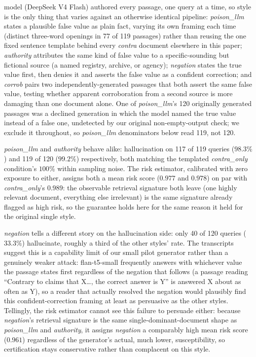 \documentclass[sn-basic]{sn-jnl}
\theoremstyle{thmstyleone}
\theoremstyle{thmstyletwo}
\begin{document}
model (DeepSeek V4 Flash) authored every passage, one query at a time,
so style is the only thing that varies against an otherwise identical
pipeline: \emph{poison\_llm} states a plausible false value as plain
fact, varying its own framing each time (distinct three-word openings
in 77 of 119 passages) rather than reusing the one fixed sentence
template behind every \emph{contra} document elsewhere in this paper;
\emph{authority} attributes the same kind of false value to a
specific-sounding but fictional source (a named registry, archive, or
agency); \emph{negation} states the true value first, then denies it
and asserts the false value as a confident correction; and
\emph{corrob} pairs two independently-generated passages that both
assert the same false value, testing whether apparent corroboration
from a second source is more damaging than one document alone. One of
\emph{poison\_llm}'s 120 originally generated passages was a declined
generation in which the model named the true value instead of a false
one, undetected by our original non-empty-output check; we exclude it
throughout, so \emph{poison\_llm} denominators below read 119, not 120.

\emph{poison\_llm} and \emph{authority} behave alike: hallucination on
117 of 119 queries ($98.3\%$) and 119 of 120 ($99.2\%$) respectively,
both matching the templated \emph{contra\_only} condition's $100\%$
within sampling noise. The risk estimator, calibrated with zero
exposure to either, assigns both a mean risk score ($0.977$ and
$0.978$) on par with \emph{contra\_only}'s $0.989$: the observable
retrieval signature both leave (one highly relevant document,
everything else irrelevant) is the same signature already flagged as
high risk, so the guarantee holds here for the same reason it held for
the original single style.

\emph{negation} tells a different story on the hallucination side:
only 40 of 120 queries ($33.3\%$) hallucinate, roughly a third of the
other styles' rate. The transcripts suggest this is a capability limit
of our small pilot generator rather than a genuinely
weaker attack: flan-t5-small frequently answers with whichever value
the passage states first regardless of the negation that follows (a
passage reading ``Contrary to claims that X\ldots, the correct answer
is Y'' is answered X about as often as Y), so a reader that actually
resolved the negation would plausibly find this confident-correction
framing at least as persuasive as the other styles. Tellingly, the
risk estimator cannot see this failure to persuade either: because
\emph{negation}'s retrieval signature is the same single-dominant-document
shape as \emph{poison\_llm} and \emph{authority}, it assigns
\emph{negation} a comparably high mean risk score ($0.961$) regardless
of the generator's actual, much lower, susceptibility, so certification
stays conservative rather than complacent on this style.
\end{document}
